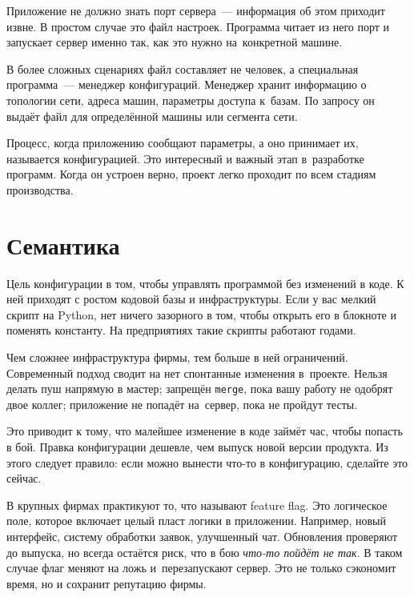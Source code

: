 Приложение не должно знать порт сервера~--- информация об этом приходит извне. В
простом случае это файл настроек. Программа читает из него порт и запускает
сервер именно так, как это нужно на~конкретной машине.


В более сложных сценариях файл составляет не человек, а специальная
программа~--- менеджер конфигураций. Менеджер хранит информацию о топологии
сети, адреса машин, параметры доступа к~базам. По запросу он выдаёт файл для
определённой машины или сегмента сети.

Процесс, когда приложению сообщают параметры, а оно принимает их, называется
конфигурацией. Это интересный и важный этап в~разработке программ. Когда он
устроен верно, проект легко проходит по всем стадиям производства.

\section{Семантика}

Цель конфигурации в том, чтобы управлять программой без изменений в коде. К ней
приходят с ростом кодовой базы и инфраструктуры. Если у вас мелкий скрипт на
Python, нет ничего зазорного в том, чтобы открыть его в блокноте и поменять
константу. На предприятиях такие скрипты работают годами.

Чем сложнее инфраструктура фирмы, тем больше в ней ограничений. Современный
подход сводит на нет спонтанные изменения в~проекте. Нельзя делать пуш
напрямую в мастер; запрещён \verb|merge|, пока вашу работу не одобрят
двое коллег; приложение не попадёт на~сервер, пока не пройдут тесты.

Это приводит к тому, что малейшее изменение в коде займёт час, чтобы попасть в
бой. Правка конфигурации дешевле, чем выпуск новой версии продукта. Из этого
следует правило: если можно вынести что-то в конфигурацию, сделайте это сейчас.


В крупных фирмах практикуют то, что называют feature flag. Это логическое поле,
которое включает целый пласт логики в приложении. Например, новый интерфейс,
систему обработки заявок, улучшенный чат. Обновления проверяют до выпуска, но
всегда остаётся риск, что в бою \emph{что-то пойдёт не так}. В таком случае флаг
меняют на ложь и~перезапускают сервер. Это не только сэкономит время, но и
сохранит репутацию фирмы.

\label{feature-flags}

